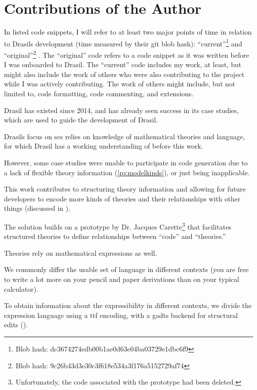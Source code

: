 \section{Contributions of the Author}
\label{sec:intro:contributions}

In listed code snippets, I will refer to at least two major points of time in
relation to Drasils development (time measured by their git blob hash):
``current''\footnote{Blob hash: dc3674274edb00b1ae0d63e04ba03729e1dbc6f9} and
``original''\footnote{Blob hash: 9c26b43d3e30c3f618e534a3f176a5152729af74}
. The ``original'' code refers
to a code snippet as it was written before I was onboarded to Drasil. The
``current'' code includes my work, at least, but might also include the work of
others who were also contributing to the project while I was actively
contributing. The work of others might include, but not limited to, code
formatting, code commenting, and extensions.

Drasil has existed since 2014, and has already seen success in its case studies,
which are used to guide the development of Drasil.

Drasils focus on \acs{scs} relies on knowledge of mathematical theories and
language, for which Drasil has a working understanding of before this work.

However, some case studies were unable to participate in code generation due to
a lack of flexible theory information (\ref{rq:modelkinds}), or just being
inapplicable.

This work contributes to structuring theory information and allowing for future
developers to encode more kinds of theories and their relationships with other
things (discussed in ).

The solution builds on a prototype by Dr. Jacques
Carette\footnote{Unfortunately, the code associated with the prototype had been
deleted.} that facilitates structured theories to define relationships between
``code'' and ``theories.''

Theories rely on mathematical expressions as well. 

We commonly differ the usable set of language in different contexts (you are
free to write a lot more on your pencil and paper derivations than on your
typical calculator).

To obtain information about the expressibility in different contexts, we divide
the expression language using a \acs{ttf} \cite{Carette2009} encoding, with a
\acsp{gadt} backend for structural edits ().

